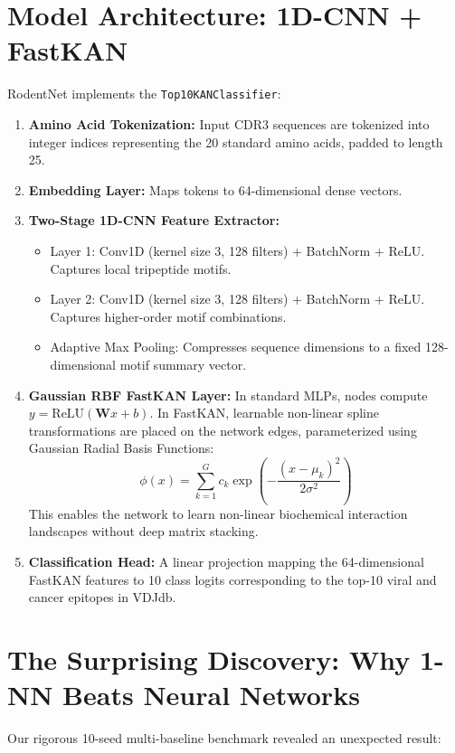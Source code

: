 \documentclass[11pt,a4paper]{report}
\begin{document}
\section{Model Architecture: 1D-CNN + FastKAN}
RodentNet implements the \lstinline|Top10KANClassifier|:
\begin{enumerate}[itemsep=2pt]
  \item \textbf{Amino Acid Tokenization:} Input CDR3 sequences are tokenized into integer indices representing the 20 standard amino acids, padded to length 25.
  \item \textbf{Embedding Layer:} Maps tokens to 64-dimensional dense vectors.
  \item \textbf{Two-Stage 1D-CNN Feature Extractor:}
  \begin{itemize}[itemsep=1pt]
    \item Layer 1: Conv1D (kernel size 3, 128 filters) + BatchNorm + ReLU. Captures local tripeptide motifs.
    \item Layer 2: Conv1D (kernel size 3, 128 filters) + BatchNorm + ReLU. Captures higher-order motif combinations.
    \item Adaptive Max Pooling: Compresses sequence dimensions to a fixed 128-dimensional motif summary vector.
  \end{itemize}
  \item \textbf{Gaussian RBF FastKAN Layer:} In standard MLPs, nodes compute $y = \text{ReLU}(\mathbf{W}x + b)$. In FastKAN, learnable non-linear spline transformations are placed on the network edges, parameterized using Gaussian Radial Basis Functions:
  \begin{equation}
  \phi(x) = \sum_{k=1}^G c_k \exp\left(-\frac{(x - \mu_k)^2}{2\sigma^2}\right)
  \end{equation}
  This enables the network to learn non-linear biochemical interaction landscapes without deep matrix stacking.
  \item \textbf{Classification Head:} A linear projection mapping the 64-dimensional FastKAN features to 10 class logits corresponding to the top-10 viral and cancer epitopes in VDJdb.
\end{enumerate}

\section{The Surprising Discovery: Why 1-NN Beats Neural Networks}
Our rigorous 10-seed multi-baseline benchmark revealed an unexpected result:
\end{document}
